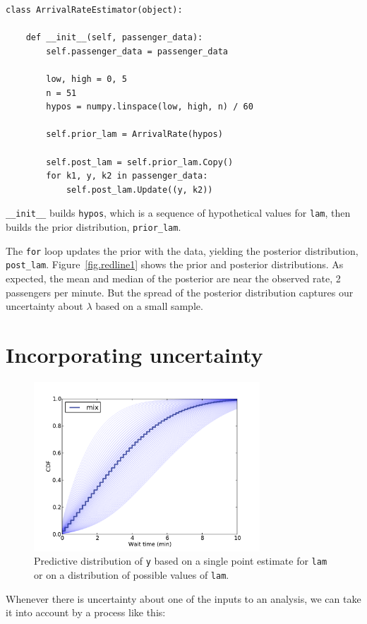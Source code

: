\documentclass[12pt]{book}
\begin{document}
\begin{verbatim}
class ArrivalRateEstimator(object):

    def __init__(self, passenger_data):
        self.passenger_data = passenger_data

        low, high = 0, 5
        n = 51
        hypos = numpy.linspace(low, high, n) / 60

        self.prior_lam = ArrivalRate(hypos)

        self.post_lam = self.prior_lam.Copy()
        for k1, y, k2 in passenger_data:
            self.post_lam.Update((y, k2))
\end{verbatim}

\verb"__init__" builds
{\tt hypos}, which is a sequence of hypothetical values for {\tt lam},
then builds the prior distribution, \verb"prior_lam".

The {\tt for} loop updates the prior with the data, yielding the posterior
distribution, \verb "post_lam".  Figure~\ref{fig.redline1} shows
the prior and posterior distributions.  As expected, the mean and
median of the posterior are near the observed rate, 2 passengers per
minute.  But the spread of the posterior distribution captures our
uncertainty about $\lambda$ based on a small sample.


\section{Incorporating uncertainty}

\begin{figure}
\centerline{\includegraphics[height=2.5in]{figs/redline4.pdf}}
\caption{Predictive distribution of {\tt y} based on a single
point estimate for {\tt lam} or on a distribution
of possible values of {\tt lam}. }
\label{fig.redline4}
\end{figure}

Whenever there is uncertainty about one of the inputs to an analysis,
we can take it into account by a process like this:
\end{document}
